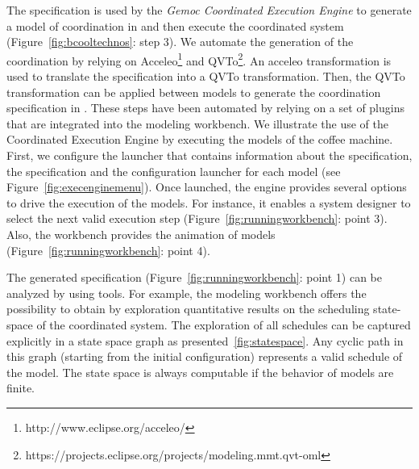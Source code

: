 The \bflow specification is used by the \emph{Gemoc Coordinated Execution Engine} to generate a model of coordination in \ccsl and then execute the coordinated system (Figure~\ref{fig:bcooltechnos}: step 3). We automate the generation of the coordination by relying on Acceleo\footnote{http://www.eclipse.org/acceleo/} and QVTo\footnote{https://projects.eclipse.org/projects/modeling.mmt.qvt-oml}. An acceleo transformation is used to translate the \bcool specification into a QVTo transformation. Then, the QVTo transformation can be applied between models to generate the coordination specification in \ccsl. These steps have been automated by relying on a set of plugins that are integrated into the modeling workbench. We illustrate the use of the Coordinated Execution Engine by executing the models of the coffee machine. First, we configure the launcher that contains information about the \bcool specification, the \bflow specification and the configuration launcher for each model (see Figure~\ref{fig:execenginemenu}). Once launched, the engine provides several options to drive the execution of the models. For instance, it enables a system designer to select the next valid execution step (Figure~\ref{fig:runningworkbench}: point 3). Also, the workbench provides the animation of models (Figure~\ref{fig:runningworkbench}: point 4). 

The generated \ccsl specification (Figure~\ref{fig:runningworkbench}: point 1) can be analyzed by using \ccsl tools. For example, the modeling workbench offers the possibility to obtain by exploration quantitative results on the scheduling state-space of the coordinated system. The exploration of all schedules can be captured explicitly in a state space graph as presented~\ref{fig:statespace}. Any cyclic path in this graph (starting from the initial configuration) represents a valid schedule of the model. The state space is always computable if the behavior of models are finite.

